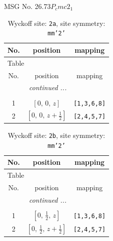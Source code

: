 \documentclass[fleqn,8pt]{jsarticle}
\begin{document}
\setcounter{MaxMatrixCols}{32}

\renewcommand{\tablename}{Table~}
\renewcommand{\figurename}{Figure~}
\begin{center}
\LARGE
MSG No. 26.73\quad$P_{c}mc2_{1}$
\end{center}
\renewcommand{\arraystretch}{1.2}
\begin{longtable}{ccc}
\caption{Wyckoff site: {\tt 2a}, site symmetry: {\tt mm'2'}}
 \\
 \hline \hline
No. & position & mapping \\ \hline \endfirsthead

\multicolumn{2}{l}{\tablename\ \thetable{}} \\
 \hline \hline
No. & position & mapping \\ \hline \endhead

 \hline \hline
\multicolumn{2}{r}{\footnotesize\it continued ...} \\ \endfoot

 \hline \hline
\multicolumn{2}{r}{} \\ \endlastfoot

1 & $\left[ 0,\, 0,\, z \right]$ & {\tt [1,3,6,8]} \\ \hline
2 & $\left[ 0,\, 0,\, z + \frac{1}{2} \right]$ & {\tt [2,4,5,7]} \\
\end{longtable}
\renewcommand{\arraystretch}{1.2}
\begin{longtable}{ccc}
\caption{Wyckoff site: {\tt 2b}, site symmetry: {\tt mm'2'}}
 \\
 \hline \hline
No. & position & mapping \\ \hline \endfirsthead

\multicolumn{2}{l}{\tablename\ \thetable{}} \\
 \hline \hline
No. & position & mapping \\ \hline \endhead

 \hline \hline
\multicolumn{2}{r}{\footnotesize\it continued ...} \\ \endfoot

 \hline \hline
\multicolumn{2}{r}{} \\ \endlastfoot

1 & $\left[ 0,\, \frac{1}{2},\, z \right]$ & {\tt [1,3,6,8]} \\ \hline
2 & $\left[ 0,\, \frac{1}{2},\, z + \frac{1}{2} \right]$ & {\tt [2,4,5,7]} \\
\end{longtable}
\end{document}
